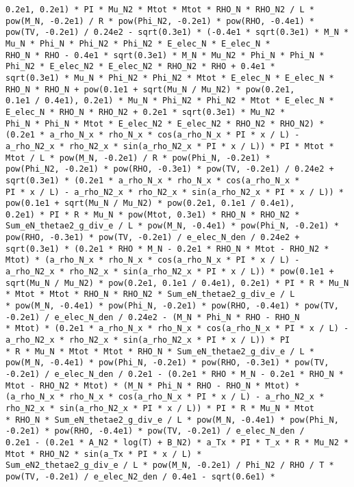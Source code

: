 \documentclass[10pt]{article}
\begin{document}
\begin{scriptsize}
\begin{verbatim}
0.2e1, 0.2e1) * PI * Mu_N2 * Mtot * Mtot * RHO_N * RHO_N2 / L * pow(M_N, -0.2e1) / R * pow(Phi_N2, -0.2e1) * pow(RHO, -0.4e1) *
pow(TV, -0.2e1) / 0.24e2 - sqrt(0.3e1) * (-0.4e1 * sqrt(0.3e1) * M_N * Mu_N * Phi_N * Phi_N2 * Phi_N2 * E_elec_N * E_elec_N *
RHO_N * RHO - 0.4e1 * sqrt(0.3e1) * M_N * Mu_N2 * Phi_N * Phi_N * Phi_N2 * E_elec_N2 * E_elec_N2 * RHO_N2 * RHO + 0.4e1 *
sqrt(0.3e1) * Mu_N * Phi_N2 * Phi_N2 * Mtot * E_elec_N * E_elec_N * RHO_N * RHO_N + pow(0.1e1 + sqrt(Mu_N / Mu_N2) * pow(0.2e1,
0.1e1 / 0.4e1), 0.2e1) * Mu_N * Phi_N2 * Phi_N2 * Mtot * E_elec_N * E_elec_N * RHO_N * RHO_N2 + 0.2e1 * sqrt(0.3e1) * Mu_N2 *
Phi_N * Phi_N * Mtot * E_elec_N2 * E_elec_N2 * RHO_N2 * RHO_N2) * (0.2e1 * a_rho_N_x * rho_N_x * cos(a_rho_N_x * PI * x / L) -
a_rho_N2_x * rho_N2_x * sin(a_rho_N2_x * PI * x / L)) * PI * Mtot * Mtot / L * pow(M_N, -0.2e1) / R * pow(Phi_N, -0.2e1) *
pow(Phi_N2, -0.2e1) * pow(RHO, -0.3e1) * pow(TV, -0.2e1) / 0.24e2 + sqrt(0.3e1) * (0.2e1 * a_rho_N_x * rho_N_x * cos(a_rho_N_x *
PI * x / L) - a_rho_N2_x * rho_N2_x * sin(a_rho_N2_x * PI * x / L)) * pow(0.1e1 + sqrt(Mu_N / Mu_N2) * pow(0.2e1, 0.1e1 / 0.4e1),
0.2e1) * PI * R * Mu_N * pow(Mtot, 0.3e1) * RHO_N * RHO_N2 * Sum_eN_thetae2_g_div_e / L * pow(M_N, -0.4e1) * pow(Phi_N, -0.2e1) *
pow(RHO, -0.3e1) * pow(TV, -0.2e1) / e_elec_N_den / 0.24e2 + sqrt(0.3e1) * (0.2e1 * RHO * M_N - 0.2e1 * RHO_N * Mtot - RHO_N2 *
Mtot) * (a_rho_N_x * rho_N_x * cos(a_rho_N_x * PI * x / L) - a_rho_N2_x * rho_N2_x * sin(a_rho_N2_x * PI * x / L)) * pow(0.1e1 +
sqrt(Mu_N / Mu_N2) * pow(0.2e1, 0.1e1 / 0.4e1), 0.2e1) * PI * R * Mu_N * Mtot * Mtot * RHO_N * RHO_N2 * Sum_eN_thetae2_g_div_e / L
* pow(M_N, -0.4e1) * pow(Phi_N, -0.2e1) * pow(RHO, -0.4e1) * pow(TV, -0.2e1) / e_elec_N_den / 0.24e2 - (M_N * Phi_N * RHO - RHO_N
* Mtot) * (0.2e1 * a_rho_N_x * rho_N_x * cos(a_rho_N_x * PI * x / L) - a_rho_N2_x * rho_N2_x * sin(a_rho_N2_x * PI * x / L)) * PI
* R * Mu_N * Mtot * Mtot * RHO_N * Sum_eN_thetae2_g_div_e / L * pow(M_N, -0.4e1) * pow(Phi_N, -0.2e1) * pow(RHO, -0.3e1) * pow(TV,
-0.2e1) / e_elec_N_den / 0.2e1 - (0.2e1 * RHO * M_N - 0.2e1 * RHO_N * Mtot - RHO_N2 * Mtot) * (M_N * Phi_N * RHO - RHO_N * Mtot) *
(a_rho_N_x * rho_N_x * cos(a_rho_N_x * PI * x / L) - a_rho_N2_x * rho_N2_x * sin(a_rho_N2_x * PI * x / L)) * PI * R * Mu_N * Mtot
* RHO_N * Sum_eN_thetae2_g_div_e / L * pow(M_N, -0.4e1) * pow(Phi_N, -0.2e1) * pow(RHO, -0.4e1) * pow(TV, -0.2e1) / e_elec_N_den /
0.2e1 - (0.2e1 * A_N2 * log(T) + B_N2) * a_Tx * PI * T_x * R * Mu_N2 * Mtot * RHO_N2 * sin(a_Tx * PI * x / L) *
Sum_eN2_thetae2_g_div_e / L * pow(M_N, -0.2e1) / Phi_N2 / RHO / T * pow(TV, -0.2e1) / e_elec_N2_den / 0.4e1 - sqrt(0.6e1) *

\end{verbatim}
\end{scriptsize}
\end{document}
